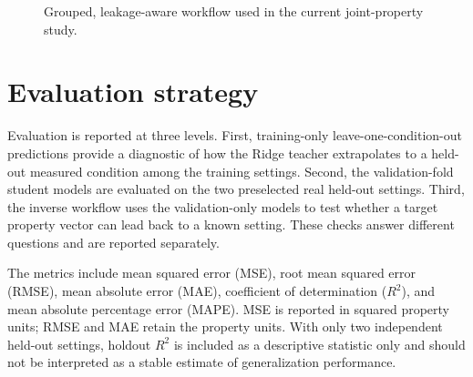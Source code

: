 \documentclass[12pt,a4paper,oneside]{report}
\begin{document}
\begin{figure}[H]
\centering
{}
\caption{Grouped, leakage-aware workflow used in the current joint-property study.}
\label{fig:updated-methodology}
\end{figure}

\section{Evaluation strategy}
Evaluation is reported at three levels. First, training-only leave-one-condition-out predictions provide a diagnostic of how the Ridge teacher extrapolates to a held-out measured condition among the training settings. Second, the validation-fold student models are evaluated on the two preselected real held-out settings. Third, the inverse workflow uses the validation-only models to test whether a target property vector can lead back to a known setting. These checks answer different questions and are reported separately.

The metrics include mean squared error (MSE), root mean squared error (RMSE), mean absolute error (MAE), coefficient of determination ($R^2$), and mean absolute percentage error (MAPE). MSE is reported in squared property units; RMSE and MAE retain the property units. With only two independent held-out settings, holdout $R^2$ is included as a descriptive statistic only and should not be interpreted as a stable estimate of generalization performance.
\end{document}
